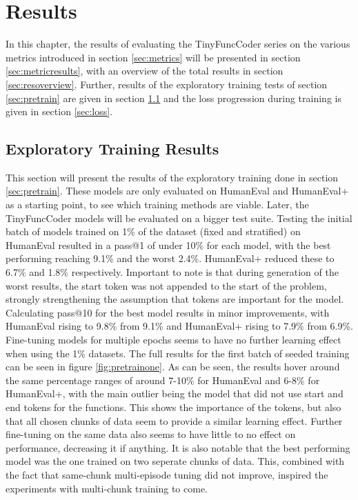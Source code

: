 \chapter{Results}
\label{chap:results}

In this chapter, the results of evaluating the TinyFuncCoder series on the various metrics introduced in section \ref{sec:metrics} will be presented in section \ref{sec:metricresults}, with an overview of the total results in section \ref{sec:resoverview}.
Further, results of the exploratory training tests of section \ref{sec:pretrain} are given in section \ref{sec:pretrainres} and the loss progression during training is given in section \ref{sec:loss}.

\section{Exploratory Training Results}
\label{sec:pretrainres}
This section will present the results of the exploratory training done in section \ref{sec:pretrain}.
These models are only evaluated on HumanEval and HumanEval+ as a starting point, to see which training methods are viable.
Later, the TinyFuncCoder models will be evaluated on a bigger test suite.
Testing the initial batch of models trained on 1\% of the dataset (fixed and stratified) on HumanEval resulted in a pass@1 of under 10\% for each model, with the best performing reaching 9.1\% and the worst 2.4\%.
HumanEval+ reduced these to 6.7\% and 1.8\% respectively.
Important to note is that during generation of the worst results, the start token was not appended to the start of the problem, strongly strengthening the assumption that tokens are important for the model.
Calculating pass@10 for the best model results in minor improvements, with HumanEval rising to 9.8\% from 9.1\% and HumanEval+ rising to 7.9\% from 6.9\%. Fine-tuning models for multiple epochs seems to have no further learning effect when using the 1\% datasets.
The full results for the first batch of seeded training can be seen in figure \ref{fig:pretrainone}.
As can be seen, the results hover around the same percentage ranges of around 7-10\% for HumanEval and 6-8\% for HumanEval+, with the main outlier being the model that did not use start and end tokens for the functions.
This shows the importance of the tokens, but also that all chosen chunks of data seem to provide a similar learning effect.
Further fine-tuning on the same data also seems to have little to no effect on performance, decreasing it if anything.
It is also notable that the best performing model was the one trained on two seperate chunks of data.
This, combined with the fact that same-chunk multi-episode tuning did not improve, inspired the experiments with multi-chunk training to come.

